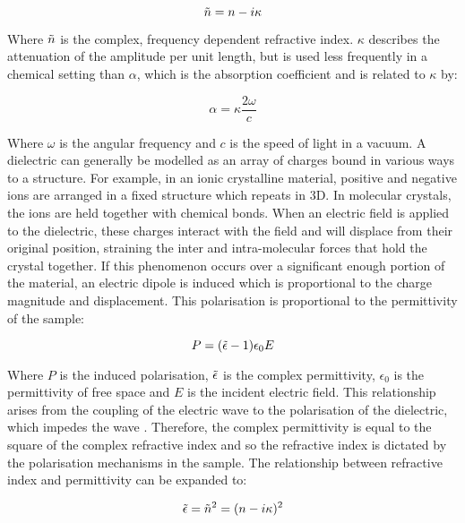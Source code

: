 \begin{equation}
\Tilde{n} = n - i\kappa
\end{equation}

Where \(\Tilde{n}\) is the complex, frequency dependent refractive index. \(\kappa\) describes the attenuation of the amplitude per unit length, but is used less frequently in a chemical setting than \(\alpha\), which is the absorption coefficient and is related to \(\kappa\) by:

\begin{equation}
\alpha = \kappa \frac{2\omega}{c}
\label{eqn:abs}
\end{equation}

Where \(\omega\) is the angular frequency and \(c\) is the speed of light in a vacuum. A dielectric can generally be modelled as an array of charges bound in various ways to a structure. For 
example, in an ionic crystalline material, positive and negative ions are arranged in a fixed structure which repeats in 3D. In molecular crystals, the ions are held together with chemical bonds. When an electric field is applied to the dielectric, these charges interact with the field and will displace from their original position, straining the inter and intra\nobreakdash-molecular forces that hold the crystal together. If this phenomenon occurs over a significant enough portion of the material, an electric dipole is induced which is proportional to the charge magnitude and displacement. This polarisation is proportional to the permittivity of the sample:

\begin{equation}
P = (\Tilde{\epsilon}-1) \epsilon_0 E
\end{equation}

Where \(P\) is the induced polarisation, \(\Tilde{\epsilon}\) is the complex permittivity, \(\epsilon_0\) is the permittivity of free space and \(E\) is the incident electric field. This relationship arises from the coupling of the electric wave to the polarisation of the dielectric, which impedes the wave \DIFdelbegin \DIFdel{~}\DIFdelend \cite{Kasap2006}. Therefore, the complex permittivity is equal to the square of the complex refractive index and so the refractive index is dictated by the polarisation mechanisms in the sample.  The relationship between refractive index and permittivity can be expanded to:

\begin{equation}
\Tilde{\epsilon} = \Tilde{n}^2 = (n - i\kappa)^2
\end{equation}

